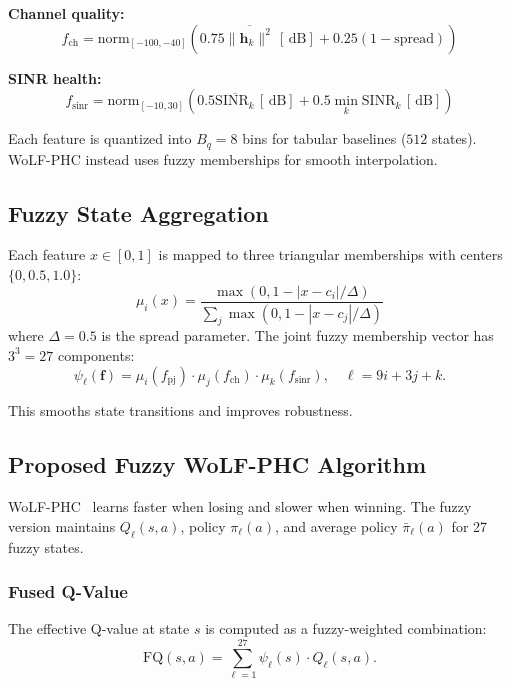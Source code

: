 \documentclass[journal,twocolumn]{IEEEtran}
\newcommand{\vect}[1]{\mathbf{#1}}
\newcommand{\dB}{\,\text{dB}}
\begin{document}
\textbf{Channel quality:}
\begin{equation}
f_{\text{ch}} = \text{norm}_{[-100,-40]}\!\left(0.75\overline{\|\vect{h}_k\|^2}\,[\dB] + 0.25(1 - \text{spread})\right)
\end{equation}

\textbf{SINR health:}
\begin{equation}
f_{\text{sinr}} = \text{norm}_{[-10,30]}\!\left(0.5\overline{\text{SINR}_k}\,[\dB] + 0.5\min_k\text{SINR}_k\,[\dB]\right)
\end{equation}

Each feature is quantized into $B_q=8$ bins for tabular baselines ($512$ states). WoLF-PHC instead uses fuzzy memberships for smooth interpolation.

\subsection{Fuzzy State Aggregation}

Each feature $x \in [0,1]$ is mapped to three triangular memberships with centers $\{0,0.5,1.0\}$:
\begin{equation}
\mu_i(x) = \frac{\max(0, 1 - |x - c_i|/\Delta)}{\sum_j \max(0, 1 - |x - c_j|/\Delta)}
\label{eq:fuzzy}
\end{equation}
where $\Delta = 0.5$ is the spread parameter. The joint fuzzy membership vector has $3^3 = 27$ components:
\begin{equation}
\psi_\ell(\vect{f}) = \mu_i(f_{\text{pj}}) \cdot \mu_j(f_{\text{ch}}) \cdot \mu_k(f_{\text{sinr}}), \quad \ell = 9i + 3j + k.
\label{eq:fuzzy_joint}
\end{equation}

This smooths state transitions and improves robustness.

\subsection{Proposed Fuzzy WoLF-PHC Algorithm}

WoLF-PHC~\cite{bowling2002wolf} learns faster when losing and slower when winning. The fuzzy version maintains $Q_\ell(s,a)$, policy $\pi_\ell(a)$, and average policy $\bar{\pi}_\ell(a)$ for 27 fuzzy states.

\subsubsection{Fused Q-Value}
The effective Q-value at state $s$ is computed as a fuzzy-weighted combination:
\begin{equation}
\text{FQ}(s, a) = \sum_{\ell=1}^{27}\psi_\ell(s) \cdot Q_\ell(s, a).
\label{eq:fused_q}
\end{equation}
\end{document}
